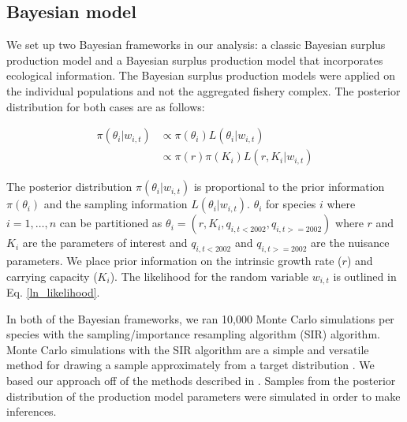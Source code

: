 \documentclass[oneside,12pt,final]{sty/ucthesis-CA2012}
\let\cite\citep                             %
\begin{document}
\begin{mainmatter}
\subsection{Bayesian model}
We set up two Bayesian frameworks in our analysis: a classic Bayesian surplus production model and a Bayesian surplus production model that incorporates ecological information. The Bayesian surplus production models were applied on the individual populations and not the aggregated fishery complex. The posterior distribution for both cases are as follows:
 
\begin{align*}
\pi(\theta_i|w_{i,t}) & \propto \pi(\theta_i)L(\theta_i|w_{i,t}) \\
& \propto \pi(r)\pi(K_i)L(r,K_i|w_{i,t})
\end{align*}

The posterior distribution $\pi(\theta_i|w_{i,t})$ is proportional to the prior information $\pi(\theta_i)$ and the sampling information $L(\theta_i|w_{i,t})$. $\theta_i$ for species $i$ where $i=1,\dots,n$ can be partitioned as $\theta_i=(r,K_i,q_{i,t<2002}, q_{i,t>=2002})$ where $r$ and $K_i$ are the parameters of interest and $q_{i,t<2002}$ and $q_{i,t>=2002}$ are the nuisance parameters. We place prior information on the intrinsic growth rate ($r$) and carrying capacity ($K_i$). The likelihood for the random variable $w_{i,t}$ is outlined in Eq. \ref{ln_likelihood}.

\vspace{5mm}

In both of the Bayesian frameworks, we ran 10,000 Monte Carlo simulations per species with the sampling/importance resampling algorithm (SIR) algorithm. Monte Carlo simulations with the SIR algorithm are a simple and versatile method for drawing a sample approximately from a target distribution \cite{mcallister1997bayesian, givens2012computational}. We based our approach off of the methods described in \citet{mcallister1997bayesian}. Samples from the posterior distribution of the production model parameters were simulated in order to make inferences.


\end{mainmatter}
\end{document}
